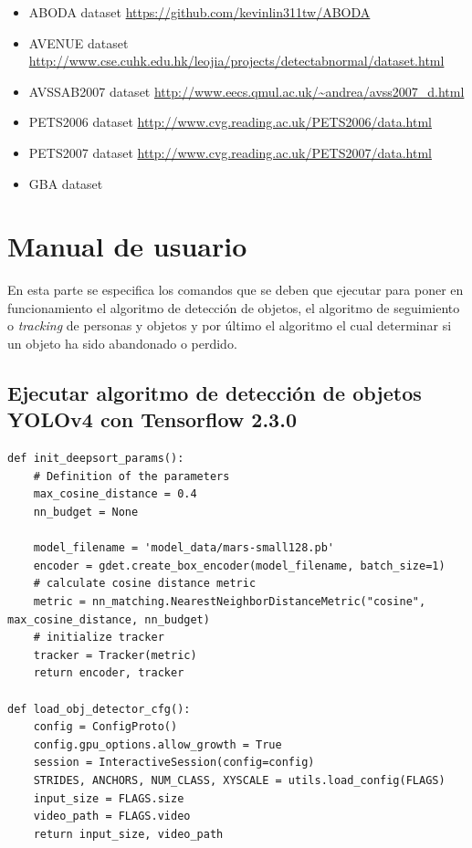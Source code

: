 \begin{itemize}
\item ABODA dataset \url{https://github.com/kevinlin311tw/ABODA} \cite{aboda-dataset}
\item AVENUE dataset \url{http://www.cse.cuhk.edu.hk/leojia/projects/detectabnormal/dataset.html} \cite{avenue-dataset}
\item AVSSAB2007 dataset \url{http://www.eecs.qmul.ac.uk/~andrea/avss2007_d.html} \cite{AVSSAB2007-dataset}
\item PETS2006 dataset \url{http://www.cvg.reading.ac.uk/PETS2006/data.html} \cite{pets2006-dataset}
\item PETS2007 dataset \url{http://www.cvg.reading.ac.uk/PETS2007/data.html} \cite{pets2007-dataset}
\item GBA dataset

\end{itemize}

\section{Manual de usuario}
\label{sec:manual-usuario}

En esta parte se especifica los comandos que se deben que ejecutar para poner en funcionamiento el algoritmo de detección de objetos, el algoritmo de seguimiento o \textit{tracking} de personas y objetos y por último el algoritmo el cual determinar si un objeto ha sido abandonado o perdido.

\subsection{Ejecutar algoritmo de detección de objetos YOLOv4 con Tensorflow 2.3.0}



\vspace{0.5cm}
\begin{lstlisting}[language=iPython,caption=Funciones de object tracking ,captionpos=b,label={lst:object-tracking}]
def init_deepsort_params():
    # Definition of the parameters
    max_cosine_distance = 0.4
    nn_budget = None

    model_filename = 'model_data/mars-small128.pb'
    encoder = gdet.create_box_encoder(model_filename, batch_size=1)
    # calculate cosine distance metric
    metric = nn_matching.NearestNeighborDistanceMetric("cosine", max_cosine_distance, nn_budget)
    # initialize tracker
    tracker = Tracker(metric)
    return encoder, tracker
    
def load_obj_detector_cfg():
    config = ConfigProto()
    config.gpu_options.allow_growth = True
    session = InteractiveSession(config=config)
    STRIDES, ANCHORS, NUM_CLASS, XYSCALE = utils.load_config(FLAGS)
    input_size = FLAGS.size
    video_path = FLAGS.video
    return input_size, video_path

\end{lstlisting}


